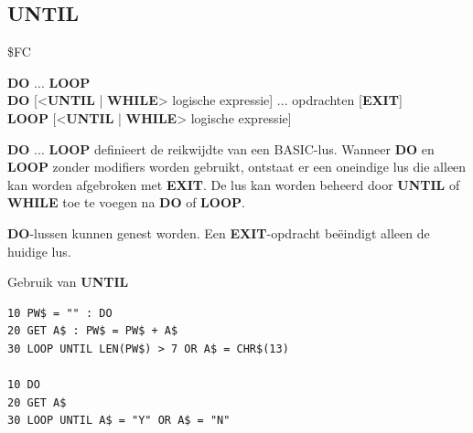 \subsection{UNTIL}
\begin{description}[leftmargin=2cm,style=nextline]
\item [Token:]    \$FC

\item [Formaat:]   {\bf DO} ... {\bf LOOP} \\                {\bf DO} [<{\bf UNTIL} | {\bf WHILE}> logische expressie] ... opdrachten [{\bf EXIT}] \\                  {\bf LOOP} [<{\bf UNTIL} | {\bf WHILE}> logische expressie]

\item [Gebruik:]    {\bf DO} ... {\bf LOOP} definieert de reikwijdte van een BASIC-lus. Wanneer {\bf DO} en {\bf LOOP} zonder modifiers worden gebruikt, ontstaat er een oneindige lus die alleen kan worden afgebroken met {\bf EXIT}. De lus kan worden beheerd door {\bf UNTIL} of {\bf WHILE} toe te voegen na {\bf DO} of {\bf LOOP}.

\item [Opmerkingen:]  {\bf DO}-lussen kunnen genest worden. Een {\bf EXIT}-opdracht beëindigt alleen de huidige lus.

\item [Voorbeelden:] Gebruik van {\bf UNTIL}

\begin{tcolorbox}[colback=black,coltext=white]
\verbatimfont{\codefont}
\begin{verbatim}
10 PW$ = "" : DO
20 GET A$ : PW$ = PW$ + A$
30 LOOP UNTIL LEN(PW$) > 7 OR A$ = CHR$(13)

10 DO
20 GET A$
30 LOOP UNTIL A$ = "Y" OR A$ = "N"
\end{verbatim}
\end{tcolorbox}
\end{description}


\newpage
